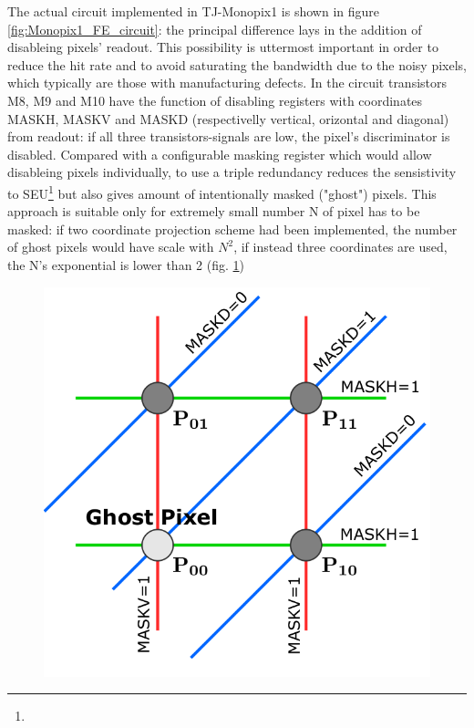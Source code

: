         The actual circuit implemented in TJ-Monopix1 is shown in figure \ref{fig:Monopix1_FE_circuit}: the principal difference lays in the addition of disableing pixels' readout. This possibility is uttermost important in order to reduce the hit rate and to avoid saturating the bandwidth due to the noisy pixels, which typically are those with manufacturing defects.
        In the circuit transistors M8, M9 and M10 have the function of disabling registers with coordinates MASKH, MASKV and MASKD (respectivelly vertical, orizontal and diagonal) from readout: if all three transistors-signals are low, the pixel's discriminator is disabled. 
        Compared with a configurable masking register which would allow disableing pixels individually, to use a triple redundancy reduces the sensistivity to SEU\footnote{} but also gives amount of intentionally masked ("ghost") pixels.
        This approach is suitable only for extremely small number N of pixel has to be masked: if two coordinate projection scheme had been implemented, the number of ghost pixels would have scale with $N^2$, if instead three coordinates are used, the N's exponential is lower than 2 (fig. \ref{fig:masking_scheme})
        \begin{figure}[h!]
            \centering
            \includegraphics[width=.3\linewidth]{figures/Monopix1/masking_scheme.png}
            \caption{}
            \label{fig:masking_scheme}
        \end{figure}

